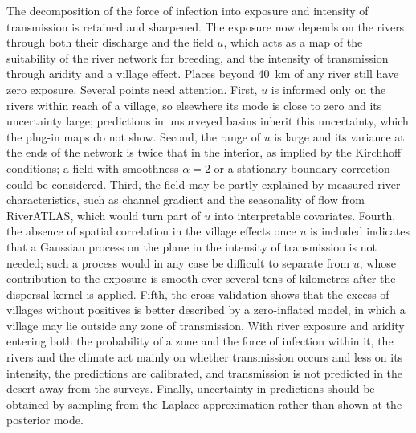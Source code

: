 \documentclass[11pt,a4paper]{article}
\begin{document}
The decomposition of the force of infection into exposure and intensity of transmission is retained and sharpened. The exposure now depends on the rivers through both their discharge and the field $u$, which acts as a map of the suitability of the river network for breeding, and the intensity of transmission through aridity and a village effect. Places beyond 40~km of any river still have zero exposure. Several points need attention. First, $u$ is informed only on the rivers within reach of a village, so elsewhere its mode is close to zero and its uncertainty large; predictions in unsurveyed basins inherit this uncertainty, which the plug-in maps do not show. Second, the range of $u$ is large and its variance at the ends of the network is twice that in the interior, as implied by the Kirchhoff conditions; a field with smoothness $\alpha = 2$ or a stationary boundary correction could be considered. Third, the field may be partly explained by measured river characteristics, such as channel gradient and the seasonality of flow from RiverATLAS, which would turn part of $u$ into interpretable covariates. Fourth, the absence of spatial correlation in the village effects once $u$ is included indicates that a Gaussian process on the plane in the intensity of transmission is not needed; such a process would in any case be difficult to separate from $u$, whose contribution to the exposure is smooth over several tens of kilometres after the dispersal kernel is applied. Fifth, the cross-validation shows that the excess of villages without positives is better described by a zero-inflated model, in which a village may lie outside any zone of transmission. With river exposure and aridity entering both the probability of a zone and the force of infection within it, the rivers and the climate act mainly on whether transmission occurs and less on its intensity, the predictions are calibrated, and transmission is not predicted in the desert away from the surveys. Finally, uncertainty in predictions should be obtained by sampling from the Laplace approximation rather than shown at the posterior mode.
\end{document}
